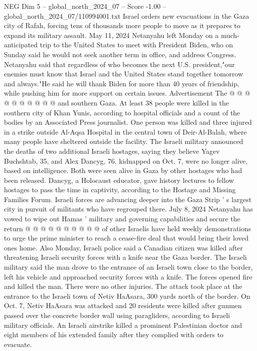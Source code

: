 \begin{textsample}{NEG Dim 5 – global\_north\_2024\_07 – Score -1.00 – global\_north\_2024\_07/110994001.txt}
Israel orders new evacuations in the Gaza city of Rafah, forcing tens of thousands more people to move as it prepares to expand its military assault.
May 11, 2024 Netanyahu left Monday on a much-anticipated trip to the United States to meet with President Biden, who on Sunday said he would not seek another term in office, and address Congress.
Netanyahu said that regardless of who becomes the next U.S. president,"our enemies must know that Israel and the United States stand together tomorrow and always."He said he will thank Biden for more than 40 years of friendship, while pushing him for more support on certain issues.
Advertisement The @ @ @ @ @ @ @ @ @ @ and southern Gaza.
At least 38 people were killed in the southern city of Khan Yunis, according to hospital officials and a count of the bodies by an Associated Press journalist.
One person was killed and three injured in a strike outside Al-Aqsa Hospital in the central town of Deir-Al-Balah, where many people have sheltered outside the facility.
The Israeli military announced the deaths of two additional Israeli hostages, saying they believe Yagev Buchshtab, 35, and Alex Dancyg, 76, kidnapped on Oct. 7, were no longer alive, based on intelligence.
Both were seen alive in Gaza by other hostages who had been released.
Dancyg, a Holocaust educator, gave history lectures to fellow hostages to pass the time in captivity, according to the Hostage and Missing Families Forum.
Israeli forces are advancing deeper into the Gaza Strip ' s largest city in pursuit of militants who have regrouped there.
July 8, 2024 Netanyahu has vowed to wipe out Hamas ' military and governing capabilities and secure the return @ @ @ @ @ @ @ @ @ @ of other Israelis have held weekly demonstrations to urge the prime minister to reach a cease-fire deal that would bring their loved ones home.
Also Monday, Israeli police said a Canadian citizen was killed after threatening Israeli security forces with a knife near the Gaza border.
The Israeli military said the man drove to the entrance of an Israeli town close to the border, left his vehicle and approached security forces with a knife.
The forces opened fire and killed the man.
There were no other injuries.
The attack took place at the entrance to the Israeli town of Netiv HaAsara, 300 yards north of the border.
On Oct. 7, Netiv HaAsara was attacked and 20 residents were killed after gunmen passed over the concrete border wall using paragliders, according to Israeli military officials.
An Israeli airstrike killed a prominent Palestinian doctor and eight members of his extended family after they complied with orders to evacuate.

\end{textsample}
